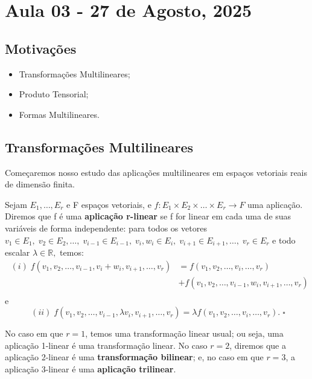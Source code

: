 \documentclass[../differential_forms.tex]{subfiles}
\begin{document}
\section{Aula 03 - 27 de Agosto, 2025}
\subsection{Motivações}
\begin{itemize}
	\item Transformações Multilineares;
	\item Produto Tensorial;
	\item Formas Multilineares.
\end{itemize}
\subsection{Transformações Multilineares}
Começaremos nosso estudo das aplicações multilineares em espaços vetoriais reais de dimensão finita.
\begin{def*}
	Sejam \(E_1, \dotsc , E_r\) e F espaços vetoriais, e \(f:E_1\times E_2\times \dotsc \times E_r\rightarrow F\) uma aplicação. Diremos que f é uma \textbf{aplicação r-linear} se f for linear em cada uma de suas variáveis de forma independente: para todos os vetores \(v_1\in E_1,\; v_2\in E_2,\dotsc,\; v_{i-1}\in E_{i-1},\; v_{i},w_{i}\in E_{i},\; v_{i+1}\in E_{i+1}, \dotsc ,\; v_r\in E_r\) e todo escalar \(\lambda \in \mathbb{R},\) temos:
	\begin{align*}
		\;(i)\; f(v_1, v_2, \dotsc, v_{i-1}, v_{i}+w_{i},v_{i+1}, \dotsc ,v_r) & = f(v_1, v_2, \dotsc , v_{i}, \dotsc , v_r)                   \\
		                                                                       & + f(v_1, v_2, \dotsc , v_{i-1}, w_{i}, v_{i+1}, \dotsc , v_r) \\
	\end{align*}
	e
	\[
		\;(ii)\; f(v_1, v_2, \dotsc, v_{i-1}, \lambda v_{i},v_{i+1}, \dotsc ,v_r) = \lambda f(v_1, v_2, \dotsc , v_{i}, \dotsc , v_r).\; \square
	\]
\end{def*}
No caso em que \(r=1\), temos uma transformação linear usual; ou seja, uma aplicação 1-linear é uma transformação linear. No caso \(r=2\), diremos que a aplicação 2-linear é uma \textbf{transformação bilinear}; e, no caso em que \(r=3\), a aplicação 3-linear é uma \textbf{aplicação trilinear}.
\end{document}
